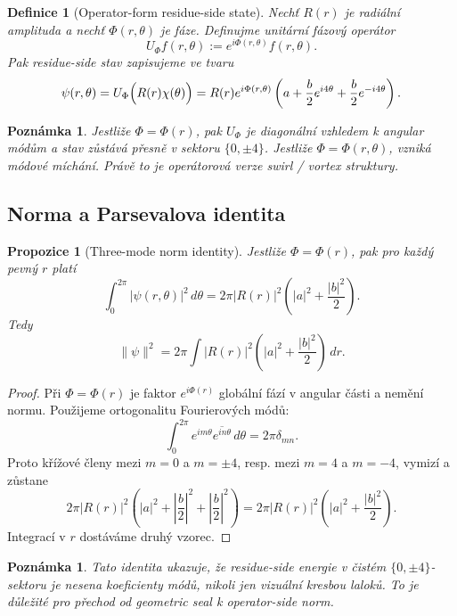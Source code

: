 \documentclass[11pt,a4paper]{article}
\newtheorem{definition}[theorem]{Definice}
\newtheorem{remark}[theorem]{Poznámka}
\newtheorem{proposition}[theorem]{Propozice}
\begin{document}
\begin{definition}[Operator-form residue-side state]
Nechť \(R(r)\) je radiální amplituda a nechť \(\Phi(r,\theta)\) je fáze.
Definujme unitární fázový operátor
\[
U_\Phi f(r,\theta):=e^{i\Phi(r,\theta)}f(r,\theta).
\]
Pak residue-side stav zapisujeme ve tvaru
\[
\psi(r,\theta)=U_\Phi\Bigl(R(r)\chi(\theta)\Bigr)
=
R(r)e^{i\Phi(r,\theta)}
\left(a+\frac b2 e^{i4\theta}+\frac b2 e^{-i4\theta}\right).
\]
\end{definition}

\begin{remark}
Jestliže \(\Phi=\Phi(r)\), pak \(U_\Phi\) je diagonální vzhledem k angular módům
a stav zůstává přesně v sektoru \(\{0,\pm4\}\).
Jestliže \(\Phi=\Phi(r,\theta)\), vzniká módové míchání.
Právě to je operátorová verze swirl / vortex struktury.
\end{remark}

\subsection*{Norma a Parsevalova identita}

\begin{proposition}[Three-mode norm identity]
Jestliže \(\Phi=\Phi(r)\), pak pro každý pevný \(r\) platí
\[
\int_0^{2\pi} |\psi(r,\theta)|^2\,d\theta
=
2\pi |R(r)|^2
\left(|a|^2+\frac{|b|^2}{2}\right).
\]
Tedy
\[
\|\psi\|^2
=
2\pi\int |R(r)|^2
\left(|a|^2+\frac{|b|^2}{2}\right)\,dr.
\]
\end{proposition}

\begin{proof}
Při \(\Phi=\Phi(r)\) je faktor \(e^{i\Phi(r)}\) globální fází v angular části a nemění normu.
Použijeme ortogonalitu Fourierových módů:
\[
\int_0^{2\pi} e^{im\theta}\overline{e^{in\theta}}\,d\theta
=
2\pi\delta_{mn}.
\]
Proto křížové členy mezi \(m=0\) a \(m=\pm4\), resp. mezi \(m=4\) a \(m=-4\), vymizí a zůstane
\[
2\pi|R(r)|^2\left(|a|^2+\left|\frac b2\right|^2+\left|\frac b2\right|^2\right)
=
2\pi|R(r)|^2\left(|a|^2+\frac{|b|^2}{2}\right).
\]
Integrací v \(r\) dostáváme druhý vzorec.
\end{proof}

\begin{remark}
Tato identita ukazuje, že residue-side energie v čistém \(\{0,\pm4\}\)-sektoru je nesena
koeficienty módů, nikoli jen vizuální kresbou laloků.
To je důležité pro přechod od geometric seal k operator-side norm.
\end{remark}
\end{document}
